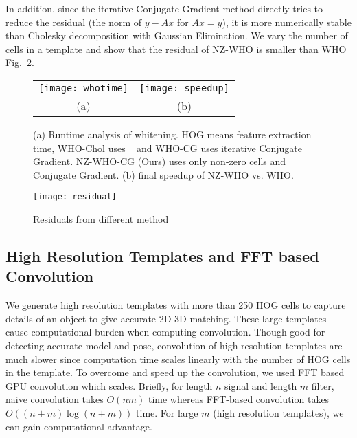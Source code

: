 In addition, since the iterative Conjugate Gradient method directly
tries to reduce the residual (the norm of $y-Ax$ for $Ax = y$), it is
more numerically stable than Cholesky decomposition with Gaussian
Elimination. We vary the number of cells in a template and show that
the residual of NZ-WHO is smaller than WHO Fig.~\ref{fig:whoresidual}.

\begin{figure}[t]
  \begin{center}
  \begin{tabular}{cc}
     \texttt{[image: whotime]} & 
     \texttt{[image: speedup]}\\
     (a) & (b) \\
 \end{tabular}
  \end{center}
  \caption{(a) Runtime analysis of whitening. HOG means feature
    extraction time, WHO-Chol uses ~\cite{Hariharan12} and
    WHO-CG uses iterative Conjugate Gradient. NZ-WHO-CG (Ours) uses only
    non-zero cells and Conjugate Gradient. (b) final speedup
    of NZ-WHO vs. WHO.}
  \label{fig:whotime}
\end{figure}
%
\begin{figure}[t]
  \centering
  \texttt{[image: residual]}
  \caption{Residuals from different method}
  \label{fig:whoresidual}
\end{figure}


\subsection{High Resolution Templates and FFT based Convolution}
\label{sec:fft} 

We generate high resolution templates with more than 250 HOG cells to capture
details of an object to give accurate 2D-3D matching. These large templates
cause computational burden when computing convolution. Though good for
detecting accurate model and pose, convolution of high-resolution templates are
much slower since computation time scales linearly with the number of HOG
cells in the template. To overcome and speed up the convolution, we used FFT
based GPU convolution \cite{Podlozhnyuk} which scales. Briefly, for length $n$
signal and length $m$ filter, naive convolution takes $O(nm)$ time whereas
FFT-based convolution takes $O\left( (n + m)\log (n+m) \right)$ time. For large
$m$ (high resolution templates), we can gain computational advantage.
